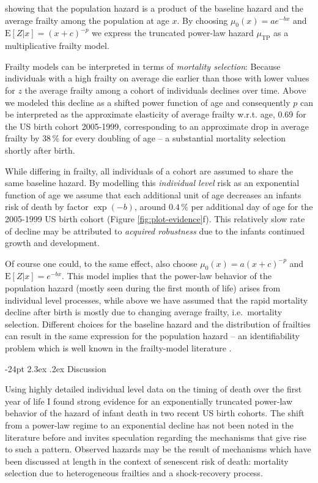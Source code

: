 \documentclass[10pt, twoside, parskip=half]{article}
\makeatletter
\renewcommand\section{\@startsection {section}{1}{\z@}%
                                   {-24pt}%
                                   {2.3ex \@plus.2ex}%
                                   {\normalfont\large\bfseries}}
\makeatother
\begin{document}
showing that the population hazard is a product of the baseline hazard
and the average frailty among the population at age \(x\). By choosing
\(\mu_0(x)=ae^{-bx}\) and \(\text{E}[Z|x]=(x+c)^{-p}\) we express the
truncated power-law hazard \(\mu_\text{TP}\) as a multiplicative frailty
model.

Frailty models can be interpreted in terms of \emph{mortality
selection}: Because individuals with a high frailty on average die
earlier than those with lower values for \(z\) the average frailty among
a cohort of individuals declines over time. Above we modeled this
decline as a shifted power function of age and consequently \(p\) can be
interpreted as the approximate elasticity of average frailty w.r.t. age,
0.69 for the US birth cohort 2005-1999, corresponding to an approximate
drop in average frailty by \(38\,\%\) for every doubling of age -- a
substantial mortality selection shortly after birth.

While differing in frailty, all individuals of a cohort are assumed to
share the same baseline hazard. By modelling this \emph{individual
level} risk as an exponential function of age we assume that each
additional unit of age decreases an infants risk of death by factor
\(\exp(-b)\), around \(0.4\,\%\) per additional day of age for the
2005-1999 US birth cohort (Figure \ref{fig:plot-evidence}f). This
relatively slow rate of decline may be attributed to \emph{acquired
robustness} due to the infants continued growth and development.

Of course one could, to the same effect, also choose
\(\mu_0(x)=a(x+c)^{-p}\) and \(\text{E}[Z|x]=e^{-bx}\). This model
implies that the power-law behavior of the population hazard (mostly
seen during the first month of life) arises from individual level
processes, while above we have assumed that the rapid mortality decline
after birth is mostly due to changing average frailty, i.e.~mortality
selection. Different choices for the baseline hazard and the
distribution of frailties can result in the same expression for the
population hazard -- an identifiability problem which is well known in
the frailty-model literature \citep[e.g.][]{Hougaard1995}.

\section{Discussion}\label{discussion}

Using highly detailed individual level data on the timing of death over
the first year of life I found strong evidence for an exponentially
truncated power-law behavior of the hazard of infant death in two recent
US birth cohorts. The shift from a power-law regime to an exponential
decline has not been noted in the literature before and invites
speculation regarding the mechanisms that give rise to such a pattern.
Observed hazards may be the result of mechanisms which have been
discussed at length in the context of senescent risk of death: mortality
selection due to heterogeneous frailties and a shock-recovery process.
\end{document}
